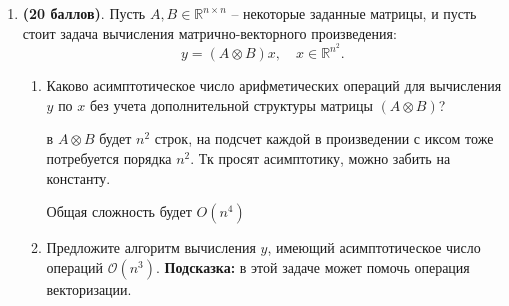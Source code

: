 \documentclass[a4paper, 11pt]{article}
\newcommand{\prob}[1]{\item \textbf{(#1 баллов)}.}
\begin{document}
\begin{enumerate}
\begin{enumerate}
	\end{enumerate}
	
	\prob{20}
	Пусть $A,B\in\mathbb{R}^{n\times n}$ -- некоторые заданные матрицы, и пусть стоит задача вычисления матрично-векторного произведения:
	\[
	y = \left(A\otimes B \right) x, \quad x \in\mathbb{R}^{n^2}.
	\]
	\begin{enumerate}
		\item Каково асимптотическое число арифметических операций для вычисления $y$ по $x$ без учета дополнительной структуры матрицы $\left(A\otimes B \right)$?
		
			в $A \otimes B$ будет $n^2$ строк, на подсчет каждой в произведении с иксом тоже потребуется порядка $n^2$. Тк просят асимптотику, можно забить на константу. 
			
			Общая сложность будет $O(n^4)$
		
		\item Предложите алгоритм вычисления $y$, имеющий асимптотическое число операций $\mathcal{O}(n^3)$. \textbf{Подсказка:} в этой задаче может помочь операция векторизации.
		

\end{enumerate}
\end{enumerate}
\end{document}
